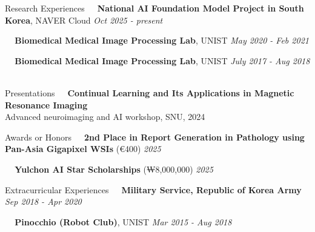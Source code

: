 \documentclass{resume} %
\begin{document}
\begin{rSection}{Research Experiences}
\textbullet~\,\, {\bf National AI Foundation Model Project in South Korea}{, NAVER Cloud} \hfill {\it Oct 2025 - present}
\\\hspace*{1.5em}{Research Residence} 

\textbullet~\,\, 
{\bf Biomedical Medical Image Processing Lab}{, UNIST} \hfill {\it May 2020 - Feb 2021}
\\ \hspace*{1.5em}{Researcher (Advisor: Prof. Se Young Chun)} 

\textbullet~\,\, 
{\bf Biomedical Medical Image Processing Lab}{, UNIST}  \hfill {\it July 2017 - Aug 2018}
\\ \hspace*{1.5em}{Student Intership (Advisor: Prof. Se Young Chun)} \\
\end{rSection}





\begin{rSection}{Presentations}
\textbullet~\,\, \textbf{Continual Learning and Its Applications in Magnetic Resonance Imaging}
\\ \hspace*{1.5em}Advanced neuroimaging and AI workshop, SNU, 2024 \\
\end{rSection}


\begin{rSection}{Awards or Honors}
\textbullet~\,\, 
{\bf 2nd Place in Report Generation in Pathology using Pan-Asia Gigapixel WSIs} (€400) \hfill {\it 2025}
\\ \hspace*{1.5em}{Challenge by International Conference on MICCAI (Served as the team leader, 26 teams participated)}

\textbullet~\,\, 
{\bf Yulchon AI Star Scholarships} (₩8,000,000) \hfill {\it 2025}
\\ \hspace*{1.5em}{Youlchon Foundation \& SNU AI Institute}
\end{rSection}


\begin{rSection}{Extracurricular Experiences}
\textbullet~\,\, 
{\bf Military Service, Republic of Korea Army} \hfill {\it Sep 2018 - Apr 2020}
\\ \hspace*{1.5em}{Discharged as Sergeant}

\textbullet~\,\, 
{\bf Pinocchio (Robot Club)}{, UNIST} \hfill {\it Mar 2015 - Aug 2018}
\\ \hspace*{1.5em}{Education Director} 
\end{rSection}
\end{document}
